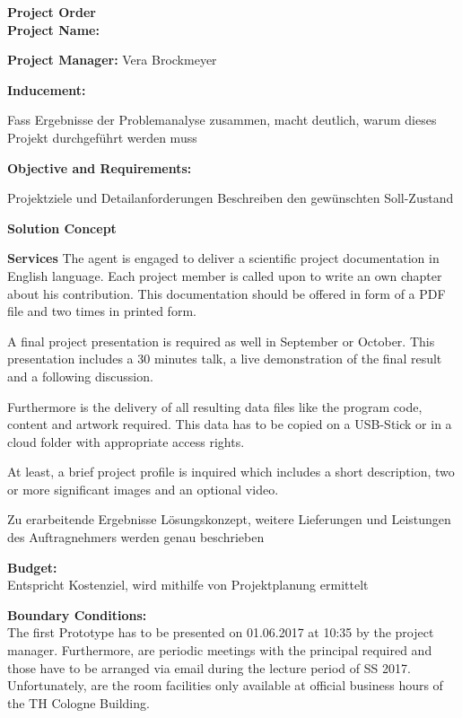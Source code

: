 \documentclass[a4paper, 12pt]{article}
\newcommand{\changefont}[3]{
\fontfamily{#1} \fontseries{#2} \fontshape{#3} \selectfont}
\begin{document}


\newpage


\textbf{\Large Project Order}\\

\textbf{Project Name:}

\textbf{Project Manager:} Vera Brockmeyer

\textbf{Inducement:}

Fass Ergebnisse der Problemanalyse zusammen, macht deutlich, warum dieses Projekt durchgeführt werden muss 

\textbf{Objective and Requirements:}

Projektziele und Detailanforderungen Beschreiben den gewünschten Soll-Zustand

\textbf{Solution Concept}

\textbf{Services}
The agent is engaged to deliver a scientific project documentation in English language. Each project member is called upon to write an own chapter about his contribution. This documentation should be offered in form of a PDF file and two times in printed form. 

A final project presentation is required as well in September or October. This presentation includes a 30 minutes talk, a live demonstration of the final result and a following discussion.

Furthermore is the delivery of all resulting data files like the program code, content and artwork required. This data has to be copied on a USB-Stick or in a cloud folder with appropriate access rights.

At least, a brief project profile is inquired which includes a short description, two or more significant images and an optional video.





Zu erarbeitende Ergebnisse Lösungskonzept, weitere Lieferungen und Leistungen des Auftragnehmers werden genau beschrieben 

\textbf{Budget:}\\
Entspricht Kostenziel, wird mithilfe von Projektplanung ermittelt

\textbf{Boundary Conditions:}\\
The first Prototype has to be presented on 01.06.2017 at 10:35 by the project manager. Furthermore, are periodic meetings with the principal required and those have to be arranged via email during the lecture period of SS 2017. Unfortunately, are the room facilities only available at official business hours of the TH Cologne Building. 
\end{document}
